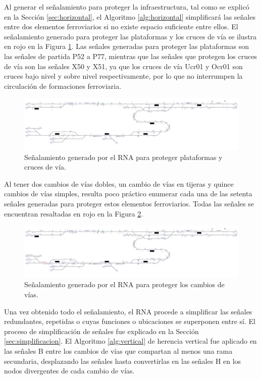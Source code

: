 	Al generar el señalamiento para proteger la infraestructura, tal como se explicó en la Sección \ref{sec:horizontal}, el Algoritmo \ref{alg:horizontal} simplificará las señales entre dos elementos ferroviarios si no existe espacio suficiente entre ellos. El señalamiento generado para proteger las plataformas y los cruces de vía se ilustra en rojo en la Figura \ref{fig:EJ3_5}. Las señales generadas para proteger las plataformas son las señales de partida P52 a P77, mientras que las señales que protegen los cruces de vía son las señales X50 y X51, ya que los cruces de vía Ucr01 y Ocr01 son cruces bajo nivel y sobre nivel respectivamente, por lo que no interrumpen la circulación de formaciones ferroviaria.
	
	\begin{figure}[H]
		\centering
		\includegraphics[width=1\textwidth]{resultados-obtenidos/ejemplo3/images/3_step3.png}
		\centering\caption{Señalamiento generado por el RNA para proteger plataformas y cruces de vía.}
		\label{fig:EJ3_5}
	\end{figure}
	
	Al tener dos cambios de vías dobles, un cambio de vías en tijeras y quince cambios de vías simples, resulta poco práctico enumerar cada una de las setenta señales generadas para proteger estos elementos ferroviarios. Todas las señales se encuentran resaltadas en rojo en la Figura \ref{fig:EJ3_6}.
	
	\begin{figure}[H]
		\centering
		\includegraphics[width=1\textwidth]{resultados-obtenidos/ejemplo3/images/3_step4.png}
		\centering\caption{Señalamiento generado por el RNA para proteger los cambios de vías.}
		\label{fig:EJ3_6}
	\end{figure}
	
	Una vez obtenido todo el señalamiento, el RNA procede a simplificar las señales redundantes, repetidas o cuyas funciones o ubicaciones se superponen entre sí. El proceso de simplificación de señales fue explicado en la Sección \ref{sec:simplificacion}. El Algoritmo \ref{alg:vertical} de herencia vertical fue aplicado en las señales B entre los cambios de vías que compartan al menos una rama secundaria, desplazando las señales hasta convertirlas en las señales H en los nodos divergentes de cada cambio de vías. 
	
